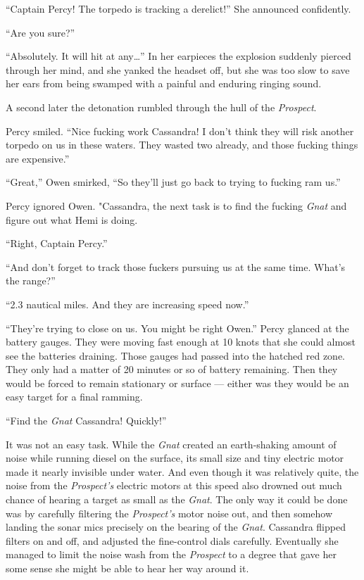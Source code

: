 \documentclass[]{scrbook}
\begin{document}
``Captain Percy! The torpedo is tracking a derelict!'' She announced
confidently.

``Are you sure?''

``Absolutely. It will hit at any\ldots{}'' In her earpieces the
explosion suddenly pierced through her mind, and she yanked the headset
off, but she was too slow to save her ears from being swamped with a
painful and enduring ringing sound.

A second later the detonation rumbled through the hull of the
\emph{Prospect}.

Percy smiled. ``Nice fucking work Cassandra! I don't think they will
risk another torpedo on us in these waters. They wasted two already, and
those fucking things are expensive.''

``Great,'' Owen smirked, ``So they'll just go back to trying to fucking
ram us.''

Percy ignored Owen. "Cassandra, the next task is to find the fucking
\emph{Gnat} and figure out what Hemi is doing.

``Right, Captain Percy.''

``And don't forget to track those fuckers pursuing us at the same time.
What's the range?''

``2.3 nautical miles. And they are increasing speed now.''

``They're trying to close on us. You might be right Owen.'' Percy
glanced at the battery gauges. They were moving fast enough at 10 knots
that she could almost see the batteries draining. Those gauges had
passed into the hatched red zone. They only had a matter of 20 minutes
or so of battery remaining. Then they would be forced to remain
stationary or surface --- either was they would be an easy target for a
final ramming.

``Find the \emph{Gnat} Cassandra! Quickly!''

It was not an easy task. While the \emph{Gnat} created an earth-shaking
amount of noise while running diesel on the surface, its small size and
tiny electric motor made it nearly invisible under water. And even
though it was relatively quite, the noise from the \emph{Prospect's}
electric motors at this speed also drowned out much chance of hearing a
target as small as the \emph{Gnat}. The only way it could be done was by
carefully filtering the \emph{Prospect's} motor noise out, and then
somehow landing the sonar mics precisely on the bearing of the
\emph{Gnat}. Cassandra flipped filters on and off, and adjusted the
fine-control dials carefully. Eventually she managed to limit the noise
wash from the \emph{Prospect} to a degree that gave her some sense she
might be able to hear her way around it.
\end{document}
